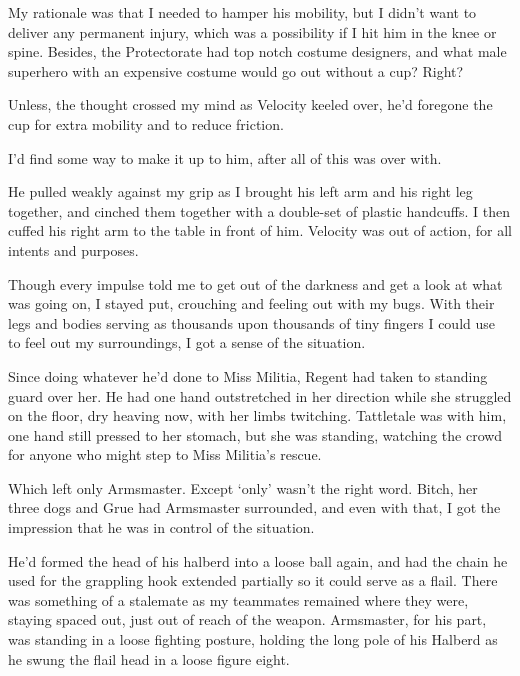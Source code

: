 My rationale was that I needed to hamper his mobility, but I didn't want to deliver any permanent injury, which was a possibility if I hit him in the knee or spine.  Besides, the Protectorate had top notch costume designers, and what male superhero with an expensive costume would go out without a cup?  Right?



Unless, the thought crossed my mind as Velocity keeled over, he'd foregone the cup for extra mobility and to reduce friction.



I'd find some way to make it up to him, after all of this was over with.



He pulled weakly against my grip as I brought his left arm and his right leg together, and cinched them together with a double-set of plastic handcuffs.  I then cuffed his right arm to the table in front of him.  Velocity was out of action, for all intents and purposes.



Though every impulse told me to get out of the darkness and get a look at what was going on, I stayed put, crouching and feeling out with my bugs.  With their legs and bodies serving as thousands upon thousands of tiny fingers I could use to feel out my surroundings, I got a sense of the situation.



Since doing whatever he'd done to Miss Militia, Regent had taken to standing guard over her.  He had one hand outstretched in her direction while she struggled on the floor, dry heaving now, with her limbs twitching.  Tattletale was with him, one hand still pressed to her stomach, but she was standing, watching the crowd for anyone who might step to Miss Militia's rescue.



Which left only Armsmaster.  Except `only' wasn't the right word.  Bitch, her three dogs and Grue had Armsmaster surrounded, and even with that, I got the impression that he was in control of the situation.



He'd formed the head of his halberd into a loose ball again, and had the chain he used for the grappling hook extended partially so it could serve as a flail.  There was something of a stalemate as my teammates remained where they were, staying spaced out, just out of reach of the weapon.  Armsmaster, for his part, was standing in a loose fighting posture, holding the long pole of his Halberd as he swung the flail head in a loose figure eight.



